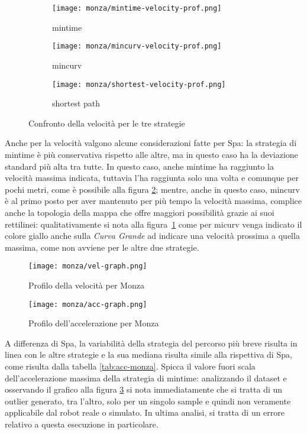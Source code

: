 \begin{figure}
	\begin{center}
	\begin{subfigure}[c]{0.3\textwidth}
		\texttt{[image: monza/mintime-velocity-prof.png]}
		\caption{mintime}
	\end{subfigure}
	\begin{subfigure}[c]{0.3\textwidth}
		\texttt{[image: monza/mincurv-velocity-prof.png]}
		\caption{mincurv}
	\end{subfigure}
	\begin{subfigure}[c]{0.365\textwidth}
		\texttt{[image: monza/shortest-velocity-prof.png]}
		\caption{shortest path}
	\end{subfigure}
		\caption{Confronto della velocità per le tre strategie}
		\label{fig:monza-vel-comparison}
	\end{center}
\end{figure}
Anche per la velocità valgono alcune considerazioni fatte per Spa: la strategia di mintime è più
conservativa rispetto alle altre, ma in questo caso ha la deviazione standard più alta tra tutte.
In questo caso, anche mintime ha raggiunto la velocità massima indicata, tuttavia l'ha raggiunta solo una
volta e comunque per pochi metri, come è possibile alla figura \ref{fig:speed-graph-monza}; mentre,
anche in questo caso, mincurv è al primo posto per aver mantenuto per più tempo la velocità massima,
complice anche la topologia della mappa che offre maggiori possibilità grazie ai suoi rettilinei:
qualitativamente si nota alla figura~\ref{fig:monza-vel-comparison} come per micurv venga indicato il
colore giallo anche sulla \textit{Curva Grande} ad indicare una velocità prossima a quella massima, come
non avviene per le altre due strategie.
\begin{figure}[H]
	\begin{center}
		\texttt{[image: monza/vel-graph.png]}
	\end{center}
	\caption{Profilo della velocità per Monza}
	\label{fig:speed-graph-monza}
\end{figure}
\begin{figure}[H]
	\begin{center}
		\texttt{[image: monza/acc-graph.png]}
	\end{center}
	\caption{Profilo dell'accelerazione per Monza}
	\label{fig:acc-graph-monza}
\end{figure}
A differenza di Spa, la variabilità della strategia del percorso più breve risulta in linea con le altre
strategie e la sua mediana risulta simile alla rispettiva di Spa, come risulta dalla tabella
\ref{tab:acc-monza}. Spicca il valore fuori scala dell'accelerazione massima della strategia di mintime:
analizzando il dataset e osservando il grafico alla figura \ref{fig:acc-graph-monza} si nota
immediatamente che si tratta di un outlier generato, tra l'altro, solo per un singolo sample e quindi non
veramente applicabile dal robot reale o simulato. In ultima analisi, si tratta di un errore relativo a
questa esecuzione in particolare.

